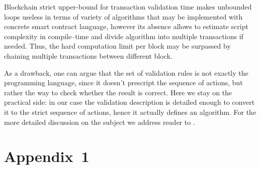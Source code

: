 \documentclass[runningheads]{llncs}
\begin{document}
    Blockchain strict upper-bound for transaction validation time makes unbounded
    loops useless in terms of variety of algorithms that may be implemented
    with concrete smart contract language, however its absence allows to
    estimate script complexity in compile--time and divide algorithm into
    multiple transactions if needed. Thus, the hard computation limit per block
    may be surpassed by chaining multiple transactions between different block.

    As a drawback, one can argue that the set of validation rules is not exactly
    the programming language, since it doesn't prescript the sequence of actions,
    but rather the way to check whether the result is correct. Here we stay on the
    practical side: in our case the validation description is detailed enough to
    convert it to the strict sequence of actions, hence it actually defines an
    algorithm. For the more detailed discussion on the subject we address reader
    to .

    
    \section{Appendix~1}
    \label{appendix1}

\end{document}
